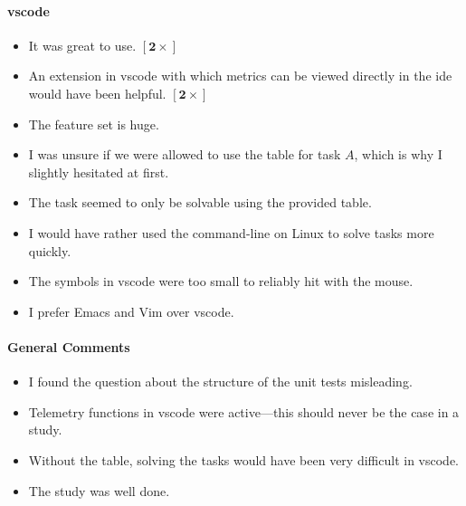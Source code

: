 \documentclass[../thesis]{subfiles}
\begin{document}
\paragraph{\gls{vscode}}
\begin{itemize}
	\item It was great to use. $\bm{[2\times]}$
	\item An extension in \gls{vscode} with which metrics can be viewed directly in the \gls{ide} would have been helpful. $\bm{[2\times]}$
	\item The feature set is huge.
	\item I was unsure if we were allowed to use the table for task $A$, which is why I slightly hesitated at first.
	\item The task seemed to only be solvable using the provided table.
	\item I would have rather used the command-line on Linux to solve tasks more quickly.
	\item The symbols in \gls{vscode} were too small to reliably hit with the mouse.
	\item I prefer Emacs and Vim over \gls{vscode}. \agree
\end{itemize}

\paragraph{General Comments}
\begin{itemize}
	\item I found the question about the structure of the unit tests misleading.
	\item Telemetry functions in \gls{vscode} were active---this should never be the case in a study.
	\item Without the table, solving the tasks would have been very difficult in \gls{vscode}.
	\item The study was well done.
\end{itemize}
\end{document}

